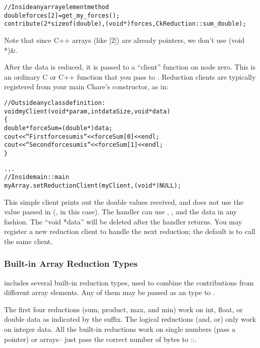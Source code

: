 \begin{alltt}
    //Inside any array element method
    double forces[2]=get_my_forces();
    contribute(2*sizeof(double),(void *)forces,CkReduction::sum_double);
\end{alltt}

Note that since C++ arrays (like [2]) are already pointers, we 
don't use (void *)\&.


After the data is reduced, it is passed to a ``client'' function on
node zero.  This is an ordinary C or C++ function that you pass to
.  Reduction clients are
typically registered from your main Chare's constructor, as in:

\begin{alltt}
//Outside any class definition:
void myClient(void *param,int dataSize,void *data)
\{
  double *forceSum=(double *)data;
  cout<<``First force sum is ``<<forceSum[0]<<endl;
  cout<<``Second force sum is ``<<forceSum[1]<<endl;
\}

...
    //Inside main::main
    myArray.setReductionClient(myClient,(void *)NULL);
\end{alltt}

This simple client prints out the double values received, and does not
use the  value passed in (, in this case).  The
handler can use , , and the data in any
fashion.  The ``void *data'' will be deleted after the handler returns.
You may register a new reduction client to handle the next reduction;
the default is to call the same client.

\subsubsection{Built-in Array Reduction Types}

\charmpp{} includes several built-in reduction types, used to combine the
contributions from different array elements.  Any of them may be passed as an
 type to .

The first four reductions (sum, product, max, and min) work on int,
float, or double data as indicated by the suffix.  The logical
reductions (and, or) only work on integer data.  All the built-in
reductions work on single numbers (pass a pointer) or arrays-- just
pass the correct number of bytes to
::.

